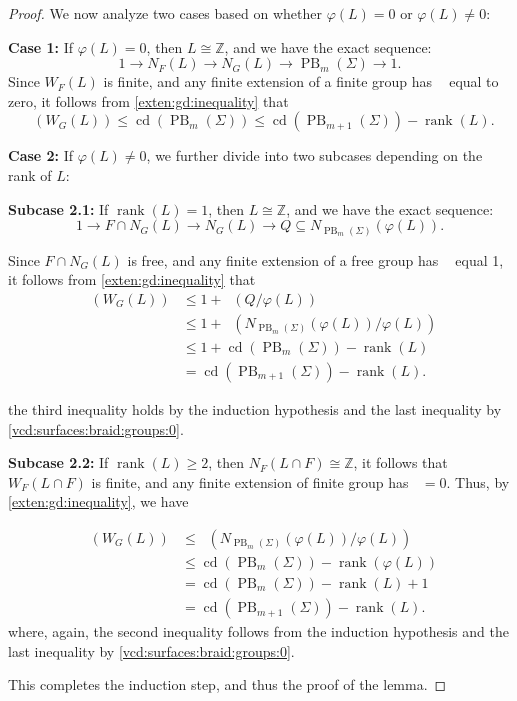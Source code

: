 \documentclass[a4paper,12pt,leqno]{amsart}
\theoremstyle{definition}
\newcommand{\calF}{{\mathcal F}}
\DeclareMathOperator{\cd}{cd}
\DeclareMathOperator{\gdfin}{gd_{\calF_0}}
\DeclareMathOperator{\pb}{PB}
\DeclareMathOperator{\rank}{rank}
\begin{document}
\begin{proof}
We now analyze two cases based on whether \( \varphi(L) = 0 \) or \( \varphi(L) \neq 0 \):

\noindent \textbf{Case 1:} If \( \varphi(L) = 0 \), then \( L \cong \mathbb{Z} \), and we have the exact sequence:
\[
1 \to N_F(L) \to N_G(L) \to \pb_m(\Sigma) \to 1.
\]
Since \( W_F(L) \) is finite, and any finite extension of a finite group has \( \gdfin \) equal to zero, it follows from \cref{exten:gd:inequality} that
\[
\gdfin(W_G(L)) \leq \cd(\pb_m(\Sigma)) \leq \cd(\pb_{m+1}(\Sigma)) - \rank(L).
\]

\noindent \textbf{Case 2:} If \( \varphi(L) \neq 0 \), we further divide into two subcases depending on the rank of \( L \):

\noindent \textbf{Subcase 2.1:} If \( \rank(L) = 1 \), then \( L \cong \mathbb{Z} \), and we have the exact sequence:
\[
1 \to F \cap N_G(L) \to N_G(L) \to Q\subseteq N_{\pb_m(\Sigma)}(\varphi(L)) .
\]

Since \( F \cap N_G(L)\) is free, and any finite extension of a free group has \( \gdfin \) equal 1, it follows from \cref{exten:gd:inequality} that
\[
\begin{aligned}
\gdfin(W_G(L)) &\leq 1 + \gdfin(Q/\varphi(L)) \\
&\leq 1 + \gdfin(N_{\pb_m(\Sigma)}(\varphi(L))/\varphi(L)) \\
&\leq 1 + \cd(\pb_m(\Sigma)) - \rank(L) \\
&= \cd(\pb_{m+1}(\Sigma)) - \rank(L).
\end{aligned}
\]


the third inequality holds by the induction hypothesis and the last inequality by \cref{vcd:surfaces:braid:groups:0}.

\noindent \textbf{Subcase 2.2:} If \( \rank(L) \geq 2 \), then \( N_F(L\cap F ) \cong \mathbb{Z} \), it follows that \( W_F(L\cap F) \) is finite, and any finite extension of finite group has \( \gdfin = 0 \). Thus, by \cref{exten:gd:inequality}, we have

\[
\begin{aligned}
\gdfin(W_G(L)) &\leq \gdfin(N_{\pb_m(\Sigma)}(\varphi(L))/\varphi(L)) \\
&\leq \cd(\pb_m(\Sigma)) - \rank(\varphi(L)) \\
&= \cd(\pb_m(\Sigma)) - \rank(L)+1 \\
&= \cd(\pb_{m+1}(\Sigma)) - \rank(L).
\end{aligned}
\]
where, again, the second inequality follows from the induction hypothesis and the last inequality by \cref{vcd:surfaces:braid:groups:0}.

This completes the induction step, and thus the proof of the lemma.
\end{proof}
\end{document}
